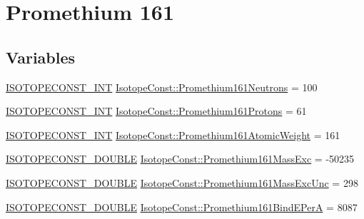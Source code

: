 \hypertarget{group___isotope_const-_promethium-_pm161}{}\section{Promethium 161}
\label{group___isotope_const-_promethium-_pm161}
\subsection*{Variables}
\begin{DoxyCompactItemize}
\item 
\mbox{\hyperlink{group___isotope_const-_macros_ga5f18360b3e99483a35c32d789e62621c}{I\+S\+O\+T\+O\+P\+E\+C\+O\+N\+S\+T\+\_\+\+I\+NT}} \mbox{\hyperlink{group___isotope_const-_promethium-_pm161_ga2777beb0d7f6b68dbcacc21d58207e24}{Isotope\+Const\+::\+Promethium161\+Neutrons}} = 100
\item 
\mbox{\hyperlink{group___isotope_const-_macros_ga5f18360b3e99483a35c32d789e62621c}{I\+S\+O\+T\+O\+P\+E\+C\+O\+N\+S\+T\+\_\+\+I\+NT}} \mbox{\hyperlink{group___isotope_const-_promethium-_pm161_ga597c4548b1471aebf5312abc06bc8f1a}{Isotope\+Const\+::\+Promethium161\+Protons}} = 61
\item 
\mbox{\hyperlink{group___isotope_const-_macros_ga5f18360b3e99483a35c32d789e62621c}{I\+S\+O\+T\+O\+P\+E\+C\+O\+N\+S\+T\+\_\+\+I\+NT}} \mbox{\hyperlink{group___isotope_const-_promethium-_pm161_ga7337cab0ddfc7c6110721b4e8c9d97c3}{Isotope\+Const\+::\+Promethium161\+Atomic\+Weight}} = 161
\item 
\mbox{\hyperlink{group___isotope_const-_macros_ga8f45a7272ce02c0b4c65c44636ed719a}{I\+S\+O\+T\+O\+P\+E\+C\+O\+N\+S\+T\+\_\+\+D\+O\+U\+B\+LE}} \mbox{\hyperlink{group___isotope_const-_promethium-_pm161_gab543a23108609935e5bdec3692fc1572}{Isotope\+Const\+::\+Promethium161\+Mass\+Exc}} = -\/50235
\item 
\mbox{\hyperlink{group___isotope_const-_macros_ga8f45a7272ce02c0b4c65c44636ed719a}{I\+S\+O\+T\+O\+P\+E\+C\+O\+N\+S\+T\+\_\+\+D\+O\+U\+B\+LE}} \mbox{\hyperlink{group___isotope_const-_promethium-_pm161_ga5239e6b794f0cf1adf445d39b508fc70}{Isotope\+Const\+::\+Promethium161\+Mass\+Exc\+Unc}} = 298
\item 
\mbox{\hyperlink{group___isotope_const-_macros_ga8f45a7272ce02c0b4c65c44636ed719a}{I\+S\+O\+T\+O\+P\+E\+C\+O\+N\+S\+T\+\_\+\+D\+O\+U\+B\+LE}} \mbox{\hyperlink{group___isotope_const-_promethium-_pm161_ga4d59a8be1b57fcb0f2a0dc4b85bd289b}{Isotope\+Const\+::\+Promethium161\+Bind\+E\+PerA}} = 8087
\item 

\end{DoxyCompactItemize}
